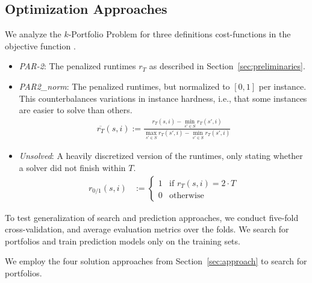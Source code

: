 \documentclass[conference]{IEEEtran}
\begin{document}
\subsection{Optimization Approaches}

We analyze the $k$-Portfolio Problem for three definitions cost-functions in the objective function .

\begin{itemize}
	\item \emph{PAR-2}: The penalized runtimes $r_T$ as described in Section~\ref{sec:preliminaries}.
	\item \emph{PAR2\_norm}: The penalized runtimes, but normalized to $[0,1]$ per instance. This counterbalances variations in instance hardness, i.e., that some instances are easier to solve than others.
	\begin{align*}
		\overline{r_T}(s,i) := \frac{r_T(s,i) - \min\limits_{s' \in S}{r_T(s',i)}}{\max\limits_{s' \in S}{r_T(s',i)} - \min\limits_{s' \in S}{r_T(s',i)}}
	\end{align*}
	\item \emph{Unsolved}: A heavily discretized version of the runtimes, only stating whether a solver did not finish within $T$.
	\begin{align*}
		r_{0/1}(s,i) &:= \begin{cases}
			1 & \text{if }r_T(s,i) = 2 \cdot T\\
			0 & \text{otherwise}
		\end{cases}
	\end{align*}
\end{itemize}

To test generalization of search and prediction approaches, we conduct five-fold cross-validation, and average evaluation metrics over the folds. 
We search for portfolios and train prediction models only on the training sets.

We employ the four solution approaches from Section~\ref{sec:approach} to search for portfolios.
\end{document}
